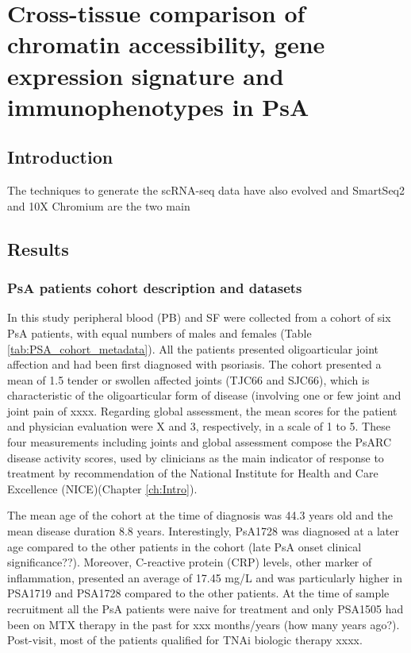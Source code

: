 \chapter{Cross-tissue comparison of chromatin accessibility, gene expression signature and immunophenotypes in PsA}
\label{ch:Results3}


\section{Introduction}
%
The techniques to generate the scRNA-seq data have also evolved and SmartSeq2 and 10X Chromium are the two main 
\section{Results}
%

\subsection{PsA patients cohort description and datasets}
In this study peripheral blood (PB) and SF were collected from a cohort of six PsA patients, with equal numbers of males and females (Table \ref{tab:PSA_cohort_metadata}). All the patients presented oligoarticular joint affection and had been first diagnosed with psoriasis. The cohort presented a mean of 1.5 tender or swollen affected joints (TJC66 and SJC66), which is characteristic of the oligoarticular form of disease (involving one or few joint and joint pain of xxxx. Regarding global assessment, the mean scores for the patient and physician evaluation were X and 3, respectively, in a scale of 1 to 5. These four measurements including joints and global assessment compose the PsARC disease activity scores, used by clinicians as the main indicator of response to treatment by recommendation of the National Institute for Health and Care Excellence (NICE)(Chapter \ref{ch:Intro}). 

The mean age of the cohort at the time of diagnosis was 44.3 years old and the mean disease duration 8.8 years. Interestingly, PsA1728 was diagnosed at a later age compared to the other patients in the cohort (late PsA onset clinical significance??). Moreover, C-reactive protein (CRP) levels, other marker of inflammation, presented an average of 17.45 mg/L and was particularly higher in PSA1719 and PSA1728 compared to the other patients. At the time of sample recruitment all the PsA patients were naive for treatment and only PSA1505 had been on MTX therapy in the past for xxx months/years (how many years ago?). Post-visit, most of the patients qualified for TNAi biologic therapy xxxx.


